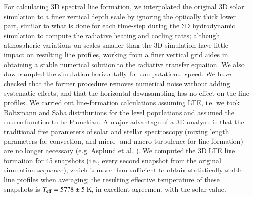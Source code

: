 \documentclass[traditabstract]{aa}
\begin{document}
For calculating 3D spectral line formation, we interpolated the original 3D solar simulation to a finer vertical depth scale by ignoring the optically thick lower part, similar to what is done for each time-step during the 3D hydrodynamic simulation to compute the radiative heating and cooling rates; although atmospheric variations on scales smaller than the 3D simulation have little impact on resulting line profiles, working from a finer vertical grid aides in obtaining a stable numerical solution to the radiative transfer equation.  We also downsampled the simulation horizontally for computational speed.  We have checked that the former procedure removes numerical noise without adding systematic effects, and that the horizontal downsampling has no effect on the line profiles.  We carried out line-formation calculations assuming LTE, i.e. we took Boltzmann and Saha distributions for the level populations and assumed the source function to be Planckian. A major advantage of a 3D analysis is that the traditional free parameters of solar and stellar spectroscopy (mixing length parameters for convection, and micro- and macro-turbulence for line formation) are no longer necessary (e.g. Asplund et al. \cite{asp1}). We computed the 3D LTE line formation for 45 snapshots (i.e., every second snapshot from the original simulation sequence), which is more than sufficient to obtain statistically stable line profiles when averaging; the resulting effective temperature of these snapshots is $T_{\rm eff} = 5778 \pm 5$\,K, in excellent agreement with the solar value.
\end{document}
